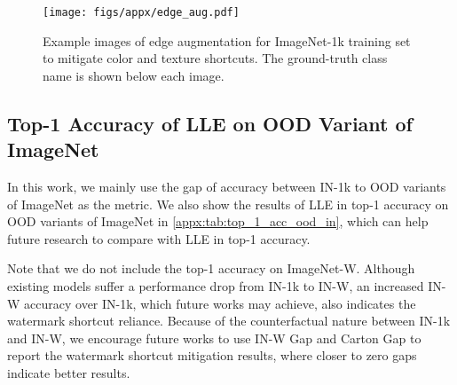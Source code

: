 \documentclass[10pt,twocolumn,letterpaper]{article}
\begin{document}
\begin{figure}[t]
    \centering
    \texttt{[image: figs/appx/edge\_aug.pdf]}
    \caption{Example images of edge augmentation for ImageNet-1k training set to mitigate color and texture shortcuts. The ground-truth class name is shown below each image.}
    \label{appx:fig:edge_aug}
\end{figure}


\subsection{Top-1 Accuracy of LLE on OOD Variant of ImageNet}

In this work, we mainly use the gap of accuracy between IN-1k to OOD variants of ImageNet as the metric. We also show the results of LLE in top-1 accuracy on OOD variants of ImageNet in \cref{appx:tab:top_1_acc_ood_in}, which can help future research to compare with LLE in top-1 accuracy.

Note that we do not include the top-1 accuracy on ImageNet-W. Although existing models suffer a performance drop from IN-1k to IN-W, an increased IN-W accuracy over IN-1k, which future works may achieve, also indicates the watermark shortcut reliance. Because of the counterfactual nature between IN-1k and IN-W, we encourage future works to use IN-W Gap and Carton Gap to report the watermark shortcut mitigation results, where closer to zero gaps indicate better results.
\end{document}
